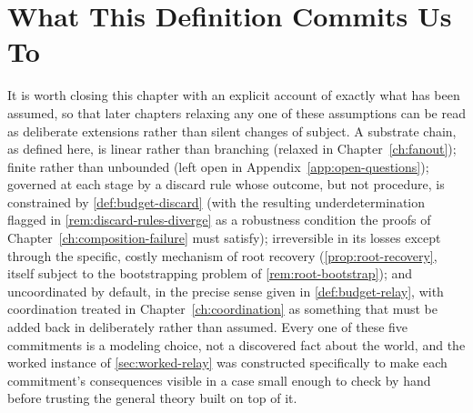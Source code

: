 \section{What This Definition Commits Us To}

It is worth closing this chapter with an explicit account of exactly what
has been assumed, so that later chapters relaxing any one of these
assumptions can be read as deliberate extensions rather than silent
changes of subject. A substrate chain, as defined here, is linear rather
than branching (relaxed in Chapter~\ref{ch:fanout}); finite rather than
unbounded (left open in Appendix~\ref{app:open-questions}); governed at
each stage by a discard rule whose outcome, but not procedure, is
constrained by \cref{def:budget-discard} (with the resulting
underdetermination flagged in \cref{rem:discard-rules-diverge} as a
robustness condition the proofs of Chapter~\ref{ch:composition-failure}
must satisfy); irreversible in its losses except through the specific,
costly mechanism of root recovery (\cref{prop:root-recovery}, itself
subject to the bootstrapping problem of \cref{rem:root-bootstrap}); and
uncoordinated by default, in the precise sense given in
\cref{def:budget-relay}, with coordination treated in
Chapter~\ref{ch:coordination} as something that must be added back in
deliberately rather than assumed. Every one of these five commitments is a
modeling choice, not a discovered fact about the world, and the worked
instance of \cref{sec:worked-relay} was constructed specifically to make
each commitment's consequences visible in a case small enough to check by
hand before trusting the general theory built on top of it.
